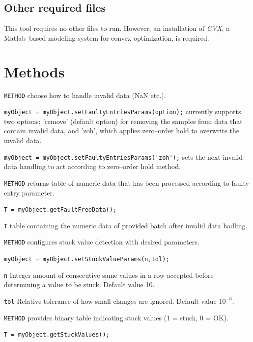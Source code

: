 \documentclass[twoside,a4paper]{refart}
\begin{document}
\subsection{Other required files}
This tool requires no other files to run. However, an installation of \emph{CVX}, a Matlab--based modeling system for convex optimization, is required.


\section{Methods}
\verb|METHOD| choose how to handle invalid data (NaN etc.).

\verb|myObject = myObject.setFaultyEntriesParams(option);| currently supports two options; 'remove' (default option) for removing the samples from data that contain invalid data, and 'zoh', which applies zero--order hold to overwrite the invalid data.

\verb|myObject = myObject.setFaultyEntriesParams('zoh');| sets the next invalid data handling to act according to zero--order hold method.

\verb|METHOD| returns table of numeric data that has been processed according to faulty entry parameter.

\verb|T = myObject.getFaultFreeData();|

\verb|T| table containing the numeric data of provided batch after invalid data hadling.

\verb|METHOD| configures stuck value detection with desired parameters.

\verb|myObject = myObject.setStuckValueParams(n,tol);|

\verb|n| Integer amount of consecutive same values in a row accepted before determining a value to be stuck. Default value 10.

\verb|tol| Relative tolerance of how small changes are ignored. Default value $10^{-6}$.

\verb|METHOD| provides binary table indicating stuck values (1 = stuck, 0 = OK).

\verb|T = myObject.getStuckValues();|
\end{document}
